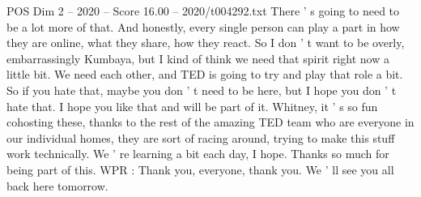 \begin{textsample}{POS Dim 2 – 2020 – Score 16.00 – 2020/t004292.txt}
There ' s going to need to be a lot more of that.
And honestly, every single person can play a part in how they are online, what they share, how they react.
So I don ' t want to be overly, embarrassingly Kumbaya, but I kind of think we need that spirit right now a little bit.
We need each other, and TED is going to try and play that role a bit.
So if you hate that, maybe you don ' t need to be here, but I hope you don ' t hate that.
I hope you like that and will be part of it.
Whitney, it ' s so fun cohosting these, thanks to the rest of the amazing TED team who are everyone in our individual homes, they are sort of racing around, trying to make this stuff work technically.
We ' re learning a bit each day, I hope.
Thanks so much for being part of this.
WPR : Thank you, everyone, thank you.
We ' ll see you all back here tomorrow.

\end{textsample}

